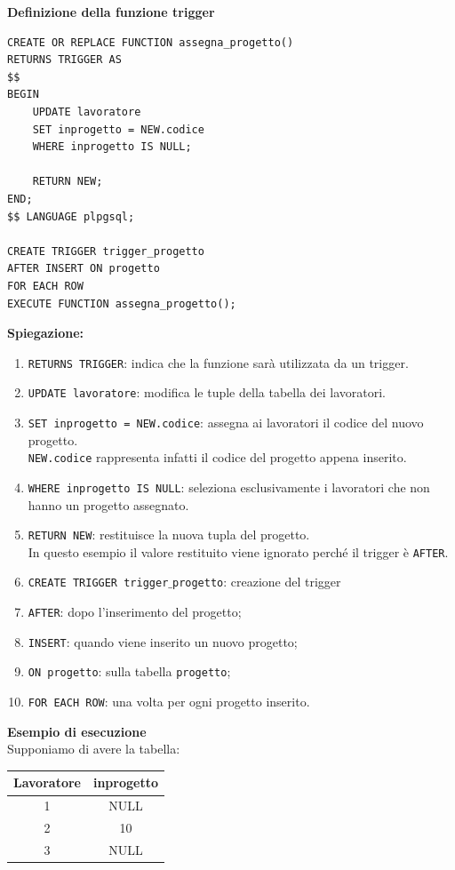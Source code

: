 \textbf{Definizione della funzione trigger}
\begin{verbatim}
CREATE OR REPLACE FUNCTION assegna_progetto()
RETURNS TRIGGER AS
$$
BEGIN
    UPDATE lavoratore
    SET inprogetto = NEW.codice
    WHERE inprogetto IS NULL;

    RETURN NEW;
END;
$$ LANGUAGE plpgsql;

CREATE TRIGGER trigger_progetto
AFTER INSERT ON progetto
FOR EACH ROW
EXECUTE FUNCTION assegna_progetto();
\end{verbatim}
\noindent
\textbf{Spiegazione:}
\begin{enumerate}
    \item \texttt{RETURNS TRIGGER}: indica
    che la funzione sarà utilizzata da un trigger.

    \item \texttt{UPDATE lavoratore}: modifica
    le tuple della tabella dei lavoratori.

    \item \texttt{SET inprogetto = NEW.codice}: assegna
    ai lavoratori il codice del nuovo progetto.\\
    \texttt{NEW.codice} rappresenta infatti
    il codice del progetto appena inserito.

    \item \texttt{WHERE inprogetto IS NULL}: seleziona
    esclusivamente i lavoratori che non hanno
    un progetto assegnato.

    \item \texttt{RETURN NEW}: restituisce
    la nuova tupla del progetto.\\
    In questo esempio il valore restituito
    viene ignorato perché il trigger è \texttt{AFTER}.

    \item \texttt{CREATE TRIGGER trigger$\_$progetto}: creazione del trigger
    
    \item \texttt{AFTER}: dopo l'inserimento
    del progetto;
    \item \texttt{INSERT}: quando viene inserito
    un nuovo progetto;
    \item \texttt{ON progetto}: sulla tabella
    \texttt{progetto};
    \item \texttt{FOR EACH ROW}: una volta
    per ogni progetto inserito.
\end{enumerate}
\noindent
\textbf{Esempio di esecuzione}\\
Supponiamo di avere la tabella:
\begin{center}
\begin{tabular}{|c|c|}
\hline
Lavoratore & inprogetto \\
\hline
1 & NULL \\
2 & 10 \\
3 & NULL \\
\hline
\end{tabular}
\end{center}
